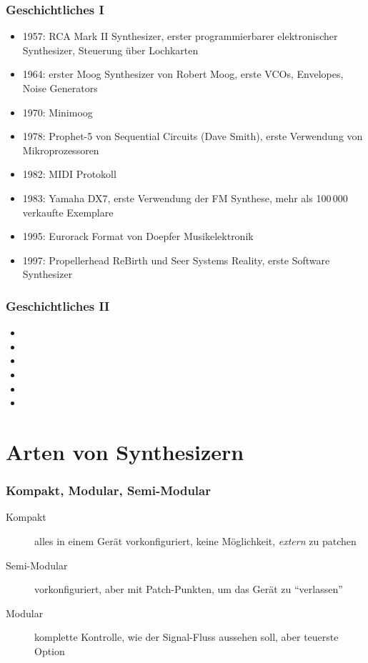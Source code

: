 \documentclass[11pt,ngerman]{beamer}
\begin{document}
\begin{frame}
\frametitle{Geschichtliches I}


\begin{itemize}
\item 1957: RCA Mark II Synthesizer, erster programmierbarer elektronischer Synthesizer, Steuerung über Lochkarten 
\item 1964: erster Moog Synthesizer von Robert Moog, erste VCOs, Envelopes, Noise Generators
\item 1970: Minimoog
\item 1978: Prophet-5 von Sequential Circuits (Dave Smith), erste Verwendung von Mikroprozessoren
\item 1982: MIDI Protokoll
\item 1983: Yamaha DX7, erste Verwendung der FM Synthese, mehr als 100\,000 verkaufte Exemplare
\item 1995: Eurorack Format von Doepfer Musikelektronik
\item 1997: Propellerhead ReBirth und Seer Systems Reality, erste Software Synthesizer
\end{itemize}
\end{frame} 
 
\begin{frame}
\frametitle{Geschichtliches II}


\begin{itemize}
\item 
\item 
\item 
\item 
\item 
\item 
\end{itemize}
\end{frame}
 
 
\section{Arten von Synthesizern}
 
\begin{frame}
\frametitle{Kompakt, Modular, Semi-Modular}

\begin{description}
\item [Kompakt] alles in einem Gerät vorkonfiguriert, keine Möglichkeit, \textit{extern} zu patchen
\item [Semi-Modular] vorkonfiguriert, aber mit Patch-Punkten, um das Gerät zu \enquote{verlassen}
\item [Modular] komplette Kontrolle, wie der Signal-Fluss aussehen soll, aber teuerste Option
\end{description}
\end{frame}
\end{document}
